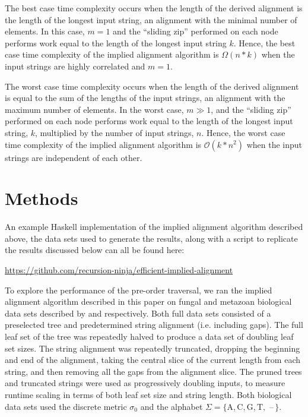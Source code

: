 \documentclass{bmcart}
\begin{document}
The best case time complexity occurs when the length of the derived alignment is the length of the longest input string, an alignment with the minimal number of elements.
In this case, $m = 1$ and the ``sliding zip'' performed on each node performs work equal to the length of the longest input string $k$.
Hence, the best case time complexity of the implied alignment algorithm is $\Omega(n*k)$ when the input strings are highly correlated and $m = 1$.

The worst case time complexity occurs when the length of the derived alignment is equal to the sum of the lengths of the input strings, an alignment with the maximum number of elements.
In the worst case, $m \gg 1$, and the ``sliding zip'' performed on each node performs work equal to the length of the longest input string, $k$, multiplied by the number of input strings, $n$.
Hence, the worst case time complexity of the implied alignment algorithm is $\mathcal{O}(k * n^2)$ when the input strings are independent of each other.


\section*{Methods}

An example Haskell implementation of the implied alignment algorithm described above, the data sets used to generate the results, along with a script to replicate the results discussed below can all be found here: 

\centerline{\url{https://github.com/recursion-ninja/efficient-implied-alignment}}

To explore the performance of the pre-order traversal, we ran the implied alignment algorithm described in this paper on fungal and metazoan biological data sets described by \cite{GiribetandWheeler1999} and \cite{GiribetandWheeler2001} respectively.
Both full data sets consisted of a preselected tree and predetermined string alignment (i.e. including gaps).
The full leaf set of the tree was repeatedly halved to produce a data set of doubling leaf set sizes.
The string alignment was repeatedly truncated, dropping the beginning and end of the alignment, taking the central slice of the current length from each string, and then removing all the gaps from the alignment slice.
The pruned trees and truncated strings were used as progressively doubling inputs, to measure runtime scaling in terms of both leaf set size and string length.
Both biological data sets used the discrete metric $\sigma_0$ and the alphabet $\Sigma = \{\mathrm{A, C, G, T,}$ --$\,\}$.
\end{document}
